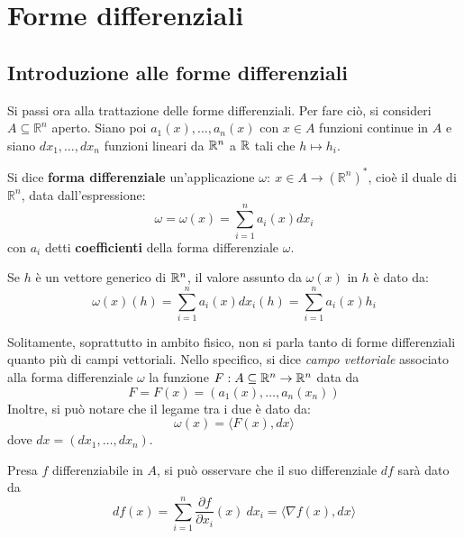 \chapter{Forme differenziali}
\section{Introduzione alle forme differenziali}
Si passi ora alla trattazione delle forme differenziali.
Per fare ciò, si consideri $A \subseteq \mathbb{R}^n$ aperto. Siano poi $a_1(x), \dots, a_n(x)$ con $x \in A$ funzioni continue in $A$ e siano $dx_1, \dots, dx_n$ funzioni lineari da $\mathbb{R}^n$ a $\mathbb{R}$ tali che $h \mapsto h_i$.
\begin{definition} \label{Def: Forma differenziale}
Si dice \textbf{forma differenziale} un'applicazione $\omega:\ x \in A \to  (\mathbb{R}^n)^*$, cioè il duale di $\mathbb{R}^n$, data dall'espressione:
\begin{equation}
    \omega= \omega(x)= \sum\limits_{i=1}^{n}{a_i(x)dx_i}
\end{equation}
con $a_i$ detti \textbf{coefficienti} della forma differenziale $\omega$.
\end{definition}
\begin{oss}
    Se $h$ è un vettore generico di $\mathbb{R}^n$, il valore assunto da $\omega(x)$ in $h$ è dato da:
    \begin{equation}
        \omega(x)(h)=\sum\limits_{i=1}^{n}{a_i(x)dx_i(h)}= \sum\limits_{i=1}^{n}{a_i(x)h_i}
    \end{equation}
\end{oss}
\begin{oss}
Solitamente, soprattutto in ambito fisico, non si parla tanto di forme differenziali quanto più di campi vettoriali. Nello specifico, si dice \textit{campo vettoriale} associato alla forma differenziale $\omega$ la funzione $F: A\subseteq \mathbb{R}^n \to \mathbb{R}^n$ data da
\begin{equation}
    F=F(x)=(a_1(x), \dots, a_n(x_n))
\end{equation}
Inoltre, si può notare che il legame tra i due è dato da:
\begin{equation} \label{Eq: Campo vettoriale}
    \omega(x)= \langle F(x), dx \rangle
\end{equation}
dove $dx= (dx_1,\dots, dx_n)$.
\end{oss}
\begin{oss}
Presa $f$ differenziabile in $A$, si può osservare che il suo differenziale $df$ sarà dato da
\begin{equation} \label{Eq: Differenziale}
    df(x)= \sum\limits_{i=1}^{n}{\frac{\partial f}{\partial x_i}(x)\ dx_i}= \langle \nabla f(x), dx\rangle
\end{equation}
\end{oss}
